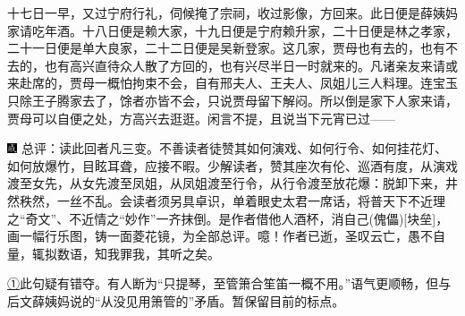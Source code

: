 十七日一早，又过宁府行礼，伺候掩了宗祠，收过影像，方回来。此日便是薛姨妈家请吃年酒。十八日便是赖大家，十九日便是宁府赖升家，二十日便是林之孝家，二十一日便是单大良家，二十二日便是吴新登家。这几家，贾母也有去的，也有不去的，也有高兴直待众人散了方回的，也有兴尽半日一时就来的。凡诸亲友来请或来赴席的，贾母一概怕拘束不会，自有邢夫人、王夫人、凤姐儿三人料理。连宝玉只除王子腾家去了，馀者亦皆不会，只说贾母留下解闷。所以倒是家下人家来请，贾母可以自便之处，方高兴去逛逛。闲言不提，且说当下元宵已过------

{\includegraphics[width=3mm]{../Images/00005}  \kaishu 总评：读此回者凡三变。不善读者徒赞其如何演戏、如何行令、如何挂花灯、如何放爆竹，目眩耳聋，应接不暇。少解读者，赞其座次有伦、巡酒有度，从演戏渡至女先，从女先渡至凤姐，从凤姐渡至行令，从行令渡至放花爆：脱卸下来，井然秩然，一丝不乱。会读者须另具卓识，单着眼史太君一席话，将普天下不近理之``奇文''、不近情之``妙作''一齐抹倒。是作者借他人酒杯，消自己{{(傀儡)}}{[}块垒{]}，画一幅行乐图，铸一面菱花镜，为全部总评。噫！作者已逝，圣叹云亡，愚不自量，辄拟数语，知我罪我，其听之矣。}

{\href{../Text/part0058_split_000.html\#navto_1_a}{①}此句疑有错夺。有人断为``只提琴，至管箫合笙笛一概不用。''语气更顺畅，但与后文薛姨妈说的``从没见用箫管的''矛盾。暂保留目前的标点。}
